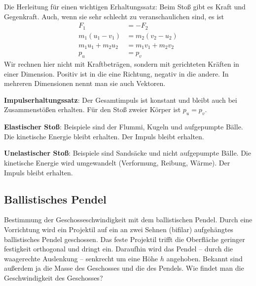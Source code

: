 \documentclass[a4paper,10pt,fleqn,twocolumn,twoside]{article}
\begin{document}
Die Herleitung für einen wichtigen Erhaltungssatz: Beim Stoß gibt es
Kraft und Gegenkraft. Auch, wenn sie sehr schlecht zu
veranschaulichen sind, es ist
\begin{align*}
F_1 &= -F_2\\
m_1(u_1-v_1) &= m_2(v_2-u_2)\\
m_1u_1+m_2u_2 &= m_1v_1+m_2v_2\\
p_u &= p_v
\end{align*}
Wir rechnen hier nicht mit Kraftbeträgen, sondern mit
gerichteten Kräften in einer Dimension. Positiv ist in die
eine Richtung, negativ in die andere. In mehreren Dimensionen nennt
man sie auch Vektoren.

\textbf{Impulserhaltungssatz}: Der Gesamtimpuls ist konstant
und bleibt auch bei Zusammenstößen erhalten. Für den Stoß zweier
Körper ist \(p_u=p_v\).

\textbf{Elastischer Stoß}: Beispiele sind der Flummi, Kugeln und
aufgepumpte Bälle. Die kinetische Energie bleibt erhalten.
Der Impuls bleibt erhalten.

\textbf{Unelastischer Stoß}: Beispiele sind Sandsäcke und nicht
aufgepumpte Bälle. Die kinetische Energie wird umgewandelt
(Verformung, Reibung, Wärme). Der Impuls bleibt erhalten.


\subsection{Ballistisches Pendel}

Bestimmung der Geschosseschwindigkeit mit dem ballistischen Pendel.
Durch eine Vorrichtung wird ein Projektil auf ein an zwei Sehnen
(bifilar) aufgehängtes ballistisches Pendel geschossen. Das feste
Projektil trifft die Oberfläche geringer festigkeit orthogonal und
dringt ein. Daraufhin wird das Pendel -- durch die waagerechte
Auslenkung -- senkrecht um eine Höhe \(h\) angehoben. Bekannt sind
außerdem ja die Masse des Geschosses und die des Pendels. Wie findet
man die Geschwindigkeit des Geschosses?
\end{document}
